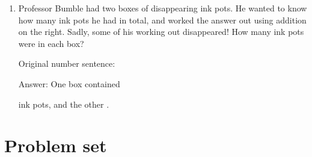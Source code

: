 \documentclass{tufte-book}
\begin{document}
\begin{enumerate}
\item Professor Bumble had two boxes of disappearing ink pots. He wanted to know how many
ink pots he had in total, and worked the answer out using addition on the right.
Sadly, some of his working out disappeared! How many ink pots were in each box?\medskip\par
{}

\medskip Original number sentence: \dotfill\medskip

Answer: One box contained
\dotfill\medskip\par
ink pots, and the other \dotfill\medskip.

\end{enumerate}

\clearpage\section{Problem set }
\end{document}
